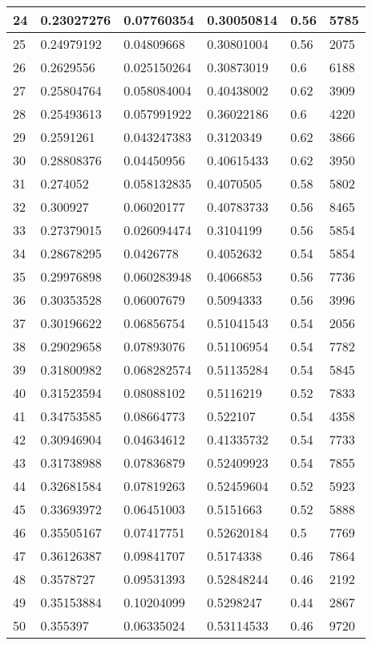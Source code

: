 \begin{longtable}{|l|l|l|l|l|l|}
24 & 0.23027276 & 0.07760354 & 0.30050814 & 0.56 & 5785 \\ \hline 
25 & 0.24979192 & 0.04809668 & 0.30801004 & 0.56 & 2075 \\ \hline 
26 & 0.2629556 & 0.025150264 & 0.30873019 & 0.6 & 6188 \\ \hline 
27 & 0.25804764 & 0.058084004 & 0.40438002 & 0.62 & 3909 \\ \hline 
28 & 0.25493613 & 0.057991922 & 0.36022186 & 0.6 & 4220 \\ \hline 
29 & 0.2591261 & 0.043247383 & 0.3120349 & 0.62 & 3866 \\ \hline 
30 & 0.28808376 & 0.04450956 & 0.40615433 & 0.62 & 3950 \\ \hline 
31 & 0.274052 & 0.058132835 & 0.4070505 & 0.58 & 5802 \\ \hline 
32 & 0.300927 & 0.06020177 & 0.40783733 & 0.56 & 8465 \\ \hline 
33 & 0.27379015 & 0.026094474 & 0.3104199 & 0.56 & 5854 \\ \hline 
34 & 0.28678295 & 0.0426778 & 0.4052632 & 0.54 & 5854 \\ \hline 
35 & 0.29976898 & 0.060283948 & 0.4066853 & 0.56 & 7736 \\ \hline 
36 & 0.30353528 & 0.06007679 & 0.5094333 & 0.56 & 3996 \\ \hline 
37 & 0.30196622 & 0.06856754 & 0.51041543 & 0.54 & 2056 \\ \hline 
38 & 0.29029658 & 0.07893076 & 0.51106954 & 0.54 & 7782 \\ \hline 
39 & 0.31800982 & 0.068282574 & 0.51135284 & 0.54 & 5845 \\ \hline 
40 & 0.31523594 & 0.08088102 & 0.5116219 & 0.52 & 7833 \\ \hline 
41 & 0.34753585 & 0.08664773 & 0.522107 & 0.54 & 4358 \\ \hline 
42 & 0.30946904 & 0.04634612 & 0.41335732 & 0.54 & 7733 \\ \hline 
43 & 0.31738988 & 0.07836879 & 0.52409923 & 0.54 & 7855 \\ \hline 
44 & 0.32681584 & 0.07819263 & 0.52459604 & 0.52 & 5923 \\ \hline 
45 & 0.33693972 & 0.06451003 & 0.5151663 & 0.52 & 5888 \\ \hline 
46 & 0.35505167 & 0.07417751 & 0.52620184 & 0.5 & 7769 \\ \hline 
47 & 0.36126387 & 0.09841707 & 0.5174338 & 0.46 & 7864 \\ \hline 
48 & 0.3578727 & 0.09531393 & 0.52848244 & 0.46 & 2192 \\ \hline 
49 & 0.35153884 & 0.10204099 & 0.5298247 & 0.44 & 2867 \\ \hline 
50 & 0.355397 & 0.06335024 & 0.53114533 & 0.46 & 9720 \\ \hline 
\end{longtable}